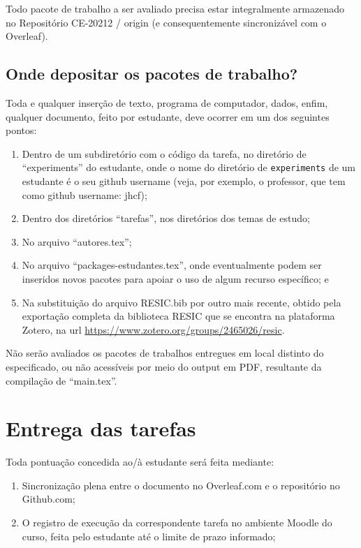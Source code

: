 Todo pacote de trabalho a ser avaliado precisa estar integralmente armazenado no Repositório CE-20212 / origin (e consequentemente sincronizável com o Overleaf).

\subsection{Onde depositar os pacotes de trabalho?}

Toda e qualquer inserção de texto, programa de computador, dados, enfim, qualquer documento, feito por estudante, deve ocorrer em um dos seguintes pontos:
\begin{enumerate}
    \item Dentro de um subdiretório com o código da tarefa, no diretório de ``experiments'' do estudante, onde o nome do diretório de \texttt{experiments} de um estudante é o seu github username (veja, por exemplo, o professor, que tem como github username: jhcf);
    \item Dentro dos diretórios ``tarefas'', nos diretórios dos temas de estudo;
    \item No arquivo ``autores.tex'';
    \item No arquivo ``packages-estudantes.tex'', onde eventualmente podem ser inseridos novos pacotes para apoiar o uso de algum recurso específico; e
    \item Na substituição do arquivo RESIC.bib por outro mais recente, obtido pela exportação completa da biblioteca RESIC que se encontra na plataforma Zotero, na url \url{https://www.zotero.org/groups/2465026/resic}.
\end{enumerate}

Não serão avaliados os pacotes de trabalhos entregues em local distinto do especificado, ou não acessíveis por meio do output em PDF, resultante da compilação de ``main.tex''.

\section{Entrega das tarefas}

Toda pontuação concedida ao/à estudante será feita mediante:
\begin{enumerate}
    \item Sincronização plena entre o documento no Overleaf.com e o repositório no Github.com;
    \item O registro de execução da correspondente tarefa no ambiente Moodle do curso, feita pelo estudante até o limite de prazo informado;
\end{enumerate}

